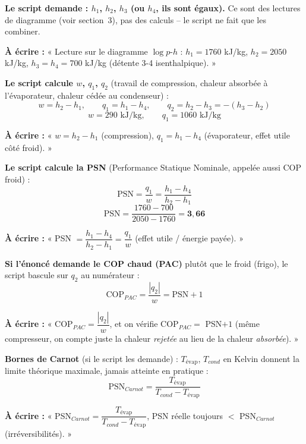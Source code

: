 \documentclass[11pt,a4paper]{article}
\newcommand{\eqb}[1]{\[\boxed{#1}\]}
\begin{document}
\begin{step}
\textbf{Le script demande : $h_1$, $h_2$, $h_3$ (ou $h_4$, ils sont égaux).} Ce sont des lectures de
diagramme (voir section~3), pas des calculs -- le script ne fait que les combiner.
\end{step}
\begin{ecrire}
\textbf{À écrire :} « Lecture sur le diagramme $\log p$-$h$ : $h_1=1760$ kJ/kg, $h_2=2050$ kJ/kg,
$h_3=h_4=700$ kJ/kg (détente 3-4 isenthalpique). »
\end{ecrire}

\begin{step}
\textbf{Le script calcule $w$, $q_1$, $q_2$} (travail de compression, chaleur absorbée à l'évaporateur,
chaleur cédée au condenseur) :
\[ w = h_2-h_1,\qquad q_1 = h_1-h_4,\qquad q_2 = h_2-h_3=-(h_3-h_2) \]
\[ w = 290\text{ kJ/kg},\qquad q_1 = 1060\text{ kJ/kg} \]
\end{step}
\begin{ecrire}
\textbf{À écrire :} « $w=h_2-h_1$ (compression), $q_1=h_1-h_4$ (évaporateur, effet utile côté
froid). »
\end{ecrire}

\begin{step}
\textbf{Le script calcule la PSN} (Performance Statique Nominale, appelée aussi COP froid) :
\eqb{\text{PSN}=\frac{q_1}{w}=\frac{h_1-h_4}{h_2-h_1}}
\[ \text{PSN} = \frac{1760-700}{2050-1760} = \mathbf{3{,}66} \]
\end{step}
\begin{ecrire}
\textbf{À écrire :} « PSN $=\dfrac{h_1-h_4}{h_2-h_1}=\dfrac{q_1}{w}$ (effet utile / énergie payée). »
\end{ecrire}

\begin{step}
\textbf{Si l'énoncé demande le COP chaud (PAC)} plutôt que le froid (frigo), le script bascule sur
$q_2$ au numérateur :
\eqb{\text{COP}_{PAC} = \frac{|q_2|}{w} = \text{PSN}+1}
\end{step}
\begin{ecrire}
\textbf{À écrire :} « COP$_{PAC}=\dfrac{|q_2|}{w}$, et on vérifie COP$_{PAC}=$ PSN$+1$ (même
compresseur, on compte juste la chaleur \emph{rejetée} au lieu de la chaleur \emph{absorbée}). »
\end{ecrire}

\begin{step}
\textbf{Bornes de Carnot} (si le script les demande) : $T_{\text{évap}}$, $T_{cond}$ en Kelvin donnent la
limite théorique maximale, jamais atteinte en pratique :
\eqb{\text{PSN}_{Carnot}=\frac{T_{\text{évap}}}{T_{cond}-T_{\text{évap}}}}
\end{step}
\begin{ecrire}
\textbf{À écrire :} « PSN$_{Carnot}=\dfrac{T_{\text{évap}}}{T_{cond}-T_{\text{évap}}}$, PSN réelle toujours
$<$ PSN$_{Carnot}$ (irréversibilités). »
\end{ecrire}
\end{document}
